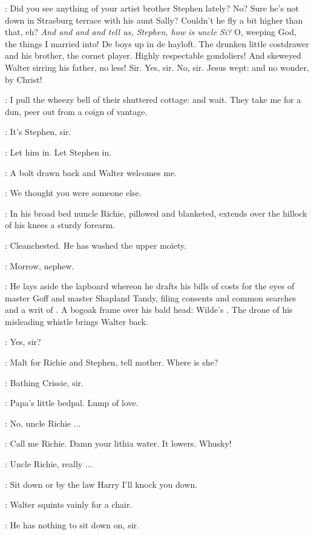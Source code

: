 \simon:
Did you see anything of your artist brother Stephen lately?
No?
Sure he's not down in Strasburg terrace with his aunt Sally?
Couldn't he fly a bit higher than that, eh?
\emph{And and and and tell us, Stephen,
how is uncle Si?}
O, weeping God, the things I married into!
De boys up in de hayloft.
The drunken little costdrawer
and his brother, the cornet player.
Highly respectable gondoliers!
And skeweyed Walter sirring his father, no less!
Sir.
Yes, sir.
No, sir.
Jesus wept:
and no wonder, by Christ!

\StephenInt:
I pull the wheezy bell of their shuttered cottage:
and wait.
They take me for a dun,
peer out from a coign of vantage.

\walter:
It's Stephen, sir.

\richie:
Let him in.
Let Stephen in.

\StephenInt:
A bolt drawn back and Walter welcomes me.

\walter:
We thought you were someone else.

:
In his broad bed
nuncle Richie, pillowed and blanketed,
extends over the hillock of his knees a sturdy forearm.

\StephenInt:
Cleanchested.
He has washed the upper moiety.

\richie:
Morrow, nephew.

:
He lays aside the lapboard whereon he drafts his bills of costs
for the eyes of master Goff and master Shapland Tandy,
filing consents and common searches and a writ of .
A bogoak frame over his bald head:
Wilde's .
The drone of his misleading whistle brings Walter back.

\walter:
Yes, sir?

\richie:
Malt for Richie and Stephen, tell mother.
Where is she?

\walter:
Bathing Crissie, sir.

\StephenInt:
Papa's little bedpal.
Lump of love.

\Stephen:
No, uncle Richie ...

\richie:
Call me Richie.
Damn your lithia water.
It lowers.
Whusky!

\Stephen:
Uncle Richie, really ...

\richie:
Sit down or by the law Harry
I'll knock you down.

:
Walter squints vainly for a chair.

\walter:
He has nothing to sit down on, sir.

